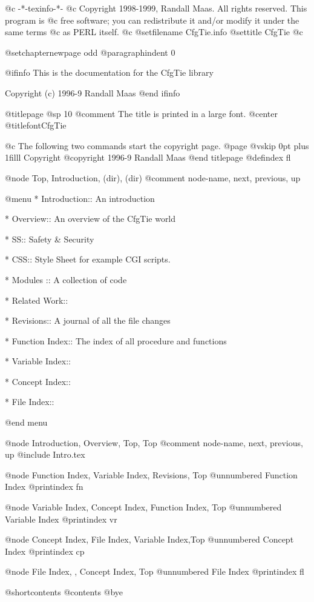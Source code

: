    @c -*-texinfo-*-
@c Copyright 1998-1999, Randall Maas.  All rights reserved.  This program is
@c free software; you can redistribute it and/or modify it under the same terms
@c as PERL itself.                                                                   
@c %
@setfilename CfgTie.info
@settitle CfgTie
@c %

@setchapternewpage odd
@paragraphindent 0

@ifinfo
This is the documentation for the CfgTie library

Copyright (c) 1996-9 Randall Maas
@end ifinfo

@titlepage
@sp 10
@comment The title is printed in a large font.
@center @titlefont{CfgTie}

@c The following two commands start the copyright page.
@page
@vskip 0pt plus 1filll
Copyright @copyright{} 1996-9 Randall Maas
@end titlepage
@defindex fl

@node    Top,       Introduction,  (dir),    (dir)
@comment node-name, next,          previous, up

@menu
* Introduction::           An introduction

* Overview::		   An overview of the CfgTie world

* SS::			   Safety & Security

* CSS::                    Style Sheet for example CGI scripts.

* Modules ::               A collection of code

* Related Work::

* Revisions::              A journal of all the file changes

* Function Index::         The index of all procedure and functions

* Variable Index::

* Concept Index::

* File Index::

@end menu

@node    Introduction, Overview, Top,      Top
@comment node-name,    next,                  previous, up
@include Intro.tex

@node Function Index, Variable Index, Revisions, Top
@unnumbered Function Index
@printindex fn

@node Variable Index, Concept Index, Function Index, Top
@unnumbered Variable Index
@printindex vr

@node Concept Index, File Index, Variable Index,Top
@unnumbered Concept Index
@printindex cp

@node File Index, , Concept Index, Top
@unnumbered File Index
@printindex fl

@shortcontents
@contents
@bye


